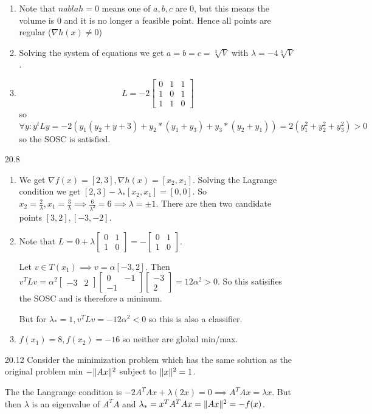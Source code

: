 \documentclass[10pt,a4paper]{article}
\DeclarePairedDelimiter{\l2}{\lVert}{\rVert}
\newcommand\m[1]{\begin{bmatrix}#1\end{bmatrix}}
\begin{document}
\begin{enumerate}
\begin{enumerate}
        \item Note that $nabla h = 0 $ means one of $a,b,c$ are 0, but this means the volume is 0 and it is no longer a feasible point. Hence all points are regular ($\nabla h(x) \neq 0$)
        \item Solving the system of equations we get $a = b = c = \sqrt[3]V$ with $\lambda= -4\sqrt[3]V$. 
        \item $$L = -2 \m{0 & 1 & 1 \\ 1& 0 & 1 \\ 1 &1 &0}$$ so $\forall y : y^tLy = -2(y_1(y_2 + y+3) + y_2*(y_1+y_3) +y_3*(y_2+y_1) ) = 2(y_1^2 + y_2^2 + y_3^2) > 0$ so the SOSC is satisfied.

    \end{enumerate}

    \item [20.8] \begin{enumerate}
        \item We get $\nabla f(x) = [2, 3], \nabla h(x) = [x_2, x_1]$. Solving the Lagrange condition we get $[2, 3] - \lambda_* [x_2, x_1] = [0, 0]$.
        So $x_2 = \frac{2}{\lambda }, x_1 = \frac{3}{\lambda} \implies \frac{6}{\lambda^2} = 6 \implies \lambda = \pm 1$. There are then two candidate points $[3,2], [-3, -2]$.

        \item Note that $L = 0 + \lambda \m{0 & 1 \\ 1 & 0} = - \m{0 & 1 \\ 1 & 0}$.
        
        Let $v \in T(x_1) \implies v = \alpha[-3, 2]$. Then $v^TLv = \alpha^2 \m{-3 & 2} \m{0 & -1 \\ -1} \m{-3 \\ 2} = 12 \alpha^2 > 0$. So this satisifies the SOSC and is therefore a mininum.

        But for $\lambda_* = 1, v^TLv = -12 \alpha^2 < 0$ so this is also a classifier.

        \item $f(x_1) = 8, f(x_2) = -16$ so neither are global min/max.

    \end{enumerate}

    \item [20.12] Consider the minimization problem which has the same solution as the original problem min $-\l2{Ax}^2$ subject to $\l2{x}^2 = 1$.
    
    The the Langrange condition is $-2A^TAx + \lambda(2x) = 0 \implies A^TAx = \lambda x$. But then $\lambda$ is an eigenvalue of $A^TA$ and $\lambda_* = x^TA^TAx = \l2{Ax}^2 = -f(x)$. 


\end{enumerate}
\end{document}
